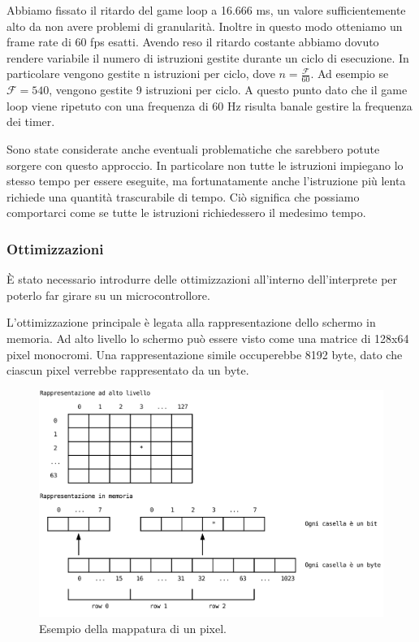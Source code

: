 \documentclass[a4paper]{article}
\begin{document}
Abbiamo fissato il ritardo del game loop a 16.666 ms, un valore sufficientemente alto da non avere problemi di granularità. Inoltre in questo modo otteniamo un frame rate di 60 fps esatti. Avendo reso il ritardo costante abbiamo dovuto rendere variabile il numero di istruzioni gestite durante un ciclo di esecuzione. In particolare vengono gestite n istruzioni per ciclo, dove $n = \frac{\mathcal{F}}{60}$. Ad esempio se $\mathcal{F} = 540$, vengono gestite 9 istruzioni per ciclo. A questo punto dato che il game loop viene ripetuto con una frequenza di 60 Hz risulta banale gestire la frequenza dei timer.

Sono state considerate anche eventuali problematiche che sarebbero potute sorgere con questo approccio. In particolare non tutte le istruzioni impiegano lo stesso tempo per essere eseguite, ma fortunatamente anche l'istruzione più lenta richiede una quantità trascurabile di tempo. Ciò significa che possiamo comportarci come se tutte le istruzioni richiedessero il medesimo tempo.

\subsubsection{Ottimizzazioni}


È stato necessario introdurre delle ottimizzazioni all'interno dell'interprete per poterlo far girare su un microcontrollore.

L'ottimizzazione principale è legata alla rappresentazione dello schermo in memoria. Ad alto livello lo schermo può essere visto come una matrice di 128x64 pixel monocromi. Una rappresentazione simile occuperebbe 8192 byte, dato che ciascun pixel verrebbe rappresentato da un byte.

\begin{figure}[h!t]
    \begin{center}
        \includegraphics[scale=0.3]{figures/screenopt.pdf}
    \end{center}
    \caption{Esempio della mappatura di un pixel.}
    \label{fig:screenopt}
\end{figure}
\end{document}
